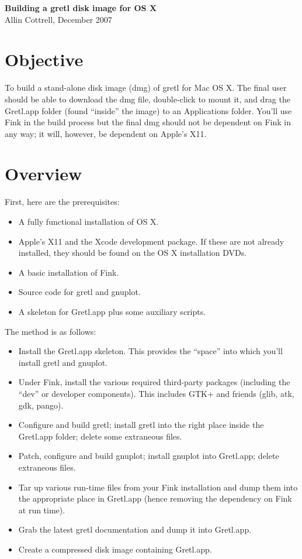 \documentclass{article}
\begin{document}
\setlength{\parskip}{1ex}
\setlength{\parindent}{0pt}

\begin{center}
  {\large \textbf{Building a gretl disk image for OS X}}\\
Allin Cottrell, December 2007
\end{center}

\section{Objective}

To build a stand-alone disk image (dmg) of gretl for Mac OS X.  The
final user should be able to download the dmg file, double-click to
mount it, and drag the Gretl.app folder (found ``inside'' the image)
to an Applications folder.  You'll use Fink in the build process but
the final dmg should not be dependent on Fink in any way; it will,
however, be dependent on Apple's X11.

\section{Overview}

First, here are the prerequisites:

\begin{itemize}
\item A fully functional installation of OS X.
\item Apple's X11 and the Xcode development package.  If these are
  not already installed, they should be found on the OS X installation
  DVDs.
\item A basic installation of Fink.
\item Source code for gretl and gnuplot.
\item A skeleton for Gretl.app plus some auxiliary scripts.
\end{itemize}

The method is as follows:

\begin{itemize}
\item Install the Gretl.app skeleton.  This provides the ``space''
  into which you'll install gretl and gnuplot.
\item Under Fink, install the various required third-party packages
  (including the ``dev'' or developer components).  This includes
  GTK+ and friends (glib, atk, gdk, pango).
\item Configure and build gretl; install gretl into the right place
  inside the Gretl.app folder; delete some extraneous files.
\item Patch, configure and build gnuplot; install gnuplot into
  Gretl.app; delete extraneous files.
\item Tar up various run-time files from your Fink installation
  and dump them into the appropriate place in Gretl.app (hence
  removing the dependency on Fink at run time).
\item Grab the latest gretl documentation and dump it into Gretl.app.
\item Create a compressed disk image containing Gretl.app.
\end{itemize}
\end{document}
